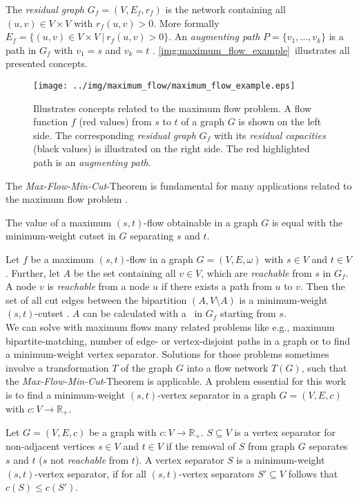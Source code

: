 The \emph{residual graph} $G_f = (V,E_f,r_f)$ is the network containing all $(u,v) \in V \times V$
with $r_f(u,v) > 0$. More formally $E_f = \{(u,v) \in V \times V\ |\ r_f(u,v) > 0\}$.
An \emph{augmenting path} $P = \{v_1,\ldots,v_k\}$ is a path in $G_f$ with $v_1 = s$ and 
$v_k = t$ \cite{edmonds1972theoretical}. \autoref{img:maximum_flow_example}~illustrates 
all presented concepts. \\
\begin{figure}
\centering
\texttt{[image: ../img/maximum\_flow/maximum\_flow\_example.eps]}
\caption{Illustrates concepts related to the maximum flow problem. A flow function $f$ 
(red values) from $s$ to $t$ of a graph $G$ is shown on the left side. The corresponding
\emph{residual graph} $G_f$ with its \emph{residual capacities} (black values) 
is illustrated on the right side. The red highlighted path is an \emph{augmenting path}.}
\label{img:maximum_flow_example}
\end{figure}
The \emph{Max-Flow-Min-Cut}-Theorem is fundamental for many applications related to the maximum
flow problem \cite{ford1956maximal}.

\begin{theorem}
The value of a maximum $(s,t)$-flow obtainable in a graph $G$ is equal with 
the minimum-weight cutset in $G$ separating $s$ and $t$.
\end{theorem}

Let $f$ be a maximum $(s,t)$-flow in a graph $G = (V,E,\omega)$ with $s \in V$ and $t \in V$. 
Further, let $A$ be the set containing all $v \in V$, which are \emph{reachable} from $s$
in $G_f$. A node $v$ is \emph{reachable} from a node $u$ if there exists a path from $u$
to $v$. Then the set of all cut edges between the bipartition $(A,V\setminus A)$ 
is a minimum-weight $(s,t)$-cutset \cite{ford2015flows}. $A$ can be calculated with a \BFS~in $G_f$ starting
from $s$. \\
We can solve with maximum flows many related problems like e.g., maximum bipartite-matching,
number of edge- or vertex-disjoint paths in a graph or to find a minimum-weight vertex
separator. Solutions for those problems sometimes involve a transformation $T$ of the graph $G$
into a flow network $T(G)$, such that the \emph{Max-Flow-Min-Cut}-Theorem is applicable. 
A problem essential for this work is to find a minimum-weight $(s,t)$-vertex separator
in a graph $G = (V,E,c)$ with $c: V \rightarrow \mathbb{R}_+$.

\begin{definition}
Let $G = (V,E,c)$ be a graph with $c: V \rightarrow \mathbb{R}_+$. $S \subseteq V$
is a vertex separator for non-adjacent vertices $s \in V$ and $t \in V$ if the
removal of $S$ from graph $G$ separates $s$ and $t$ ($s$ not \emph{reachable} from $t$).
A vertex separator $S$ is a minimum-weight $(s,t)$-vertex separator, if for all 
$(s,t)$-vertex separators $S' \subseteq V$ follows that $c(S) \le c(S')$.
\end{definition}

